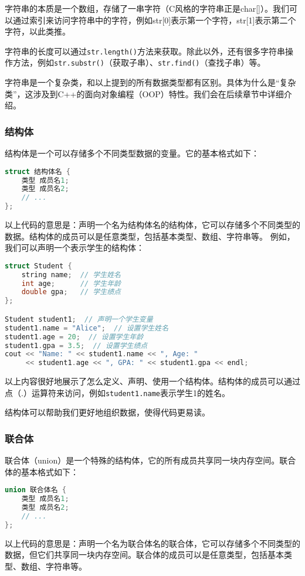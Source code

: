 字符串的本质是一个数组，存储了一串字符（C风格的字符串正是char[]）。我们可以通过索引来访问字符串中的字符，例如str[0]表示第一个字符，str[1]表示第二个字符，以此类推。

字符串的长度可以通过\texttt{str.length()}方法来获取。除此以外，还有很多字符串操作方法，例如\texttt{str.substr()}（获取子串）、\texttt{str.find()}（查找子串）等。

字符串是一个复杂类，和以上提到的所有数据类型都有区别。具体为什么是“复杂类”，这涉及到C++的面向对象编程（OOP）特性。我们会在后续章节中详细介绍。

\subsubsection{结构体}
结构体是一个可以存储多个不同类型数据的变量。它的基本格式如下：
\begin{lstlisting}[language=C++]
struct 结构体名 {
    类型 成员名1;
    类型 成员名2;
    // ...
};
\end{lstlisting}
以上代码的意思是：声明一个名为结构体名的结构体，它可以存储多个不同类型的数据。结构体的成员可以是任意类型，包括基本类型、数组、字符串等。
例如，我们可以声明一个表示学生的结构体：
\begin{lstlisting}[language=C++]
struct Student {
    string name;  // 学生姓名
    int age;      // 学生年龄
    double gpa;   // 学生绩点
};

Student student1;  // 声明一个学生变量
student1.name = "Alice";  // 设置学生姓名
student1.age = 20;  // 设置学生年龄
student1.gpa = 3.5;  // 设置学生绩点
cout << "Name: " << student1.name << ", Age: "
     << student1.age << ", GPA: " << student1.gpa << endl;
\end{lstlisting}

以上内容很好地展示了怎么定义、声明、使用一个结构体。结构体的成员可以通过点（.）运算符来访问，例如\texttt{student1.name}表示学生1的姓名。

结构体可以帮助我们更好地组织数据，使得代码更易读。

\subsubsection{联合体}

联合体（union）是一个特殊的结构体，它的所有成员共享同一块内存空间。联合体的基本格式如下：
\begin{lstlisting}[language=C++]
union 联合体名 {
    类型 成员名1;
    类型 成员名2;
    // ...
};
\end{lstlisting}
以上代码的意思是：声明一个名为联合体名的联合体，它可以存储多个不同类型的数据，但它们共享同一块内存空间。联合体的成员可以是任意类型，包括基本类型、数组、字符串等。

